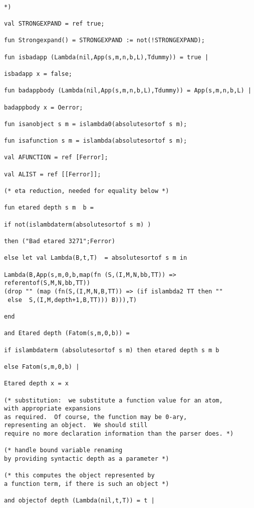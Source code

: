 \documentclass[12pt]{article}
\begin{document}
\newpage

\begin{verbatim}

*)

val STRONGEXPAND = ref true;

fun Strongexpand() = STRONGEXPAND := not(!STRONGEXPAND);

fun isbadapp (Lambda(nil,App(s,m,n,b,L),Tdummy)) = true |

isbadapp x = false;

fun badappbody (Lambda(nil,App(s,m,n,b,L),Tdummy)) = App(s,m,n,b,L) |

badappbody x = Oerror;

fun isanobject s m = islambda0(absolutesortof s m);

fun isafunction s m = islambda(absolutesortof s m);

val AFUNCTION = ref [Ferror];

val ALIST = ref [[Ferror]];

(* eta reduction, needed for equality below *)

fun etared depth s m  b =

if not(islambdaterm(absolutesortof s m) )

then ("Bad etared 3271";Ferror)

else let val Lambda(B,t,T)  = absolutesortof s m in

Lambda(B,App(s,m,0,b,map(fn (S,(I,M,N,bb,TT)) => 
referentof(S,M,N,bb,TT))
(drop "" (map (fn(S,(I,M,N,B,TT)) => (if islambda2 TT then ""
 else  S,(I,M,depth+1,B,TT))) B))),T)

end

and Etared depth (Fatom(s,m,0,b)) =

if islambdaterm (absolutesortof s m) then etared depth s m b

else Fatom(s,m,0,b) |

Etared depth x = x

(* substitution:  we substitute a function value for an atom, 
with appropriate expansions
as required.  Of course, the function may be 0-ary, 
representing an object.  We should still
require no more declaration information than the parser does. *)

(* handle bound variable renaming 
by providing syntactic depth as a parameter *)

(* this computes the object represented by
a function term, if there is such an object *)

and objectof depth (Lambda(nil,t,T)) = t |


\end{verbatim}
\end{document}
